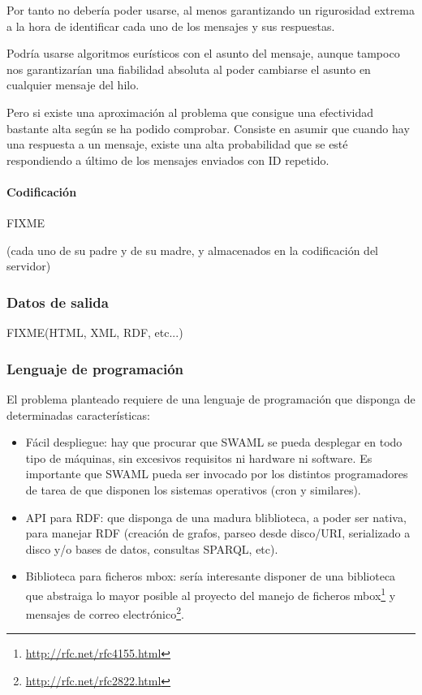 Por tanto no debería poder usarse, al menos garantizando un rigurosidad extrema
a la hora de identificar cada uno de los mensajes y sus respuestas.

Podría usarse algoritmos eurísticos con el asunto del mensaje, aunque tampoco nos
garantizarían una fiabilidad absoluta al poder cambiarse el asunto en cualquier
mensaje del hilo.

Pero si existe una aproximación al problema que consigue una efectividad bastante
alta según se ha podido comprobar. Consiste en asumir que cuando hay una respuesta
a un mensaje, existe una alta probabilidad que se esté respondiendo a último de los 
mensajes enviados con ID repetido.

\paragraph{Codificación}

FIXME

(cada uno de su padre y de su madre, y almacenados en la codificación del
servidor)

\subsubsection{Datos de salida}

FIXME(HTML, XML, RDF, etc...)

\subsubsection{Lenguaje de programación}

El problema planteado requiere de una lenguaje de programación que disponga
de determinadas características:

\begin{itemize}
  \item Fácil despliegue: hay que procurar que SWAML se pueda desplegar en
	todo tipo de máquinas, sin excesivos requisitos ni hardware ni software.
	Es importante que SWAML pueda ser invocado por los distintos programadores
	de tarea de que disponen los sistemas operativos (cron y similares).
  \item API para RDF: que disponga de una madura bliblioteca, a poder ser nativa, 
	para manejar RDF (creación de grafos, parseo desde disco/URI, serializado
	a disco y/o bases de datos, consultas SPARQL, etc).
  \item Biblioteca para ficheros mbox: sería interesante disponer de una biblioteca 
	que abstraiga lo mayor posible al proyecto del manejo de ficheros
	mbox\footnote{\url{http://rfc.net/rfc4155.html}} y mensajes de correo 
	electrónico\footnote{\url{http://rfc.net/rfc2822.html}}.
\end{itemize}

